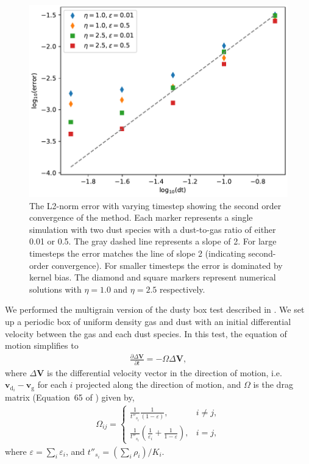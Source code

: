 \documentclass[fleqn,usenatbib]{mnras}
\newcommand{\g}{\mathrm{g}}
\newcommand{\dd}{\mathrm{d}}
\let\vec\bm
\begin{document}
\begin{figure}
   \begin{center}
      \includegraphics[width=\columnwidth]{figs/dustybox_accuracy.pdf}
      \caption{The L2-norm error with varying timestep showing the second order
         convergence of the method. Each marker represents a single simulation
         with two dust species with a dust-to-gas ratio of either 0.01 or 0.5.
         The gray dashed line represents a slope of 2. For large timesteps the
         error matches the line of slope 2 (indicating second-order
         convergence). For smaller timesteps the error is dominated by kernel
         bias. The diamond and square markers represent numerical solutions with
         \(\eta=1.0\) and \(\eta=2.5\) respectively.%
         \label{fig:dustybox-accuracy}}
   \end{center}
\end{figure}

We performed the multigrain version of the dusty box test described in
\citet{Laibe2011MNRAS.418.1491L}. We set up a periodic box of uniform density
gas and dust with an initial differential velocity between the gas and each dust
species. In this test, the equation of motion simplifies to
%
\begin{align}
   \frac{\partial \Delta \vec{V}}{\partial t} = - \Omega \Delta \vec{V},
\end{align}
%
where \(\Delta \vec{V}\) is the differential velocity vector in the direction of
motion, i.e. \(\vec{v}_{\dd_i} - \vec{v}_{\g}\) for each \(i\) projected along
the direction of motion, and \(\Omega\) is the drag matrix (Equation~65 of
\citealt{Laibe2014MNRAS.444.1940L}) given by,
%
\begin{align}
   \Omega_{ij} =
   \begin{cases}
      \frac{1}{t''_{s_i}} \frac{1}{(1 - \varepsilon)}, &i \neq j,\\
      \frac{1}{t''_{s_i}} \left( \frac{1}{\varepsilon_i} +
         \frac{1}{1 - \varepsilon} \right), &i = j,
   \end{cases}
\end{align}
%
where \( \varepsilon = \sum_i \varepsilon_i \), and \( t''_{s_i} = \left( \sum_i
\rho_i \right) / K_i \).
\end{document}
